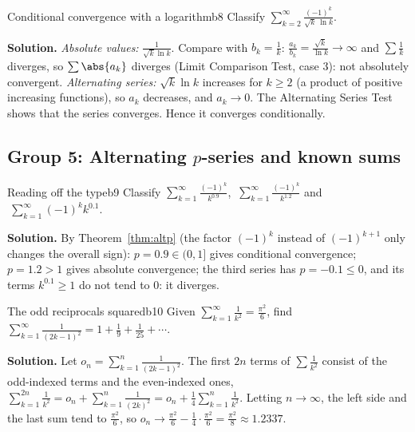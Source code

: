 \documentclass[11pt]{article}
\begin{document}
\begin{exmp}{Conditional convergence with a logarithm}{b8}
Classify $\displaystyle\sum_{k=2}^\infty\frac{(-1)^k}{\sqrt k\,\ln k}$.

\textbf{Solution.} \emph{Absolute values:} $\frac1{\sqrt k\ln k}$. Compare with $b_k=\frac1k$: $\frac{a_k}{b_k}=\frac{\sqrt k}{\ln k}\to\infty$ and $\sum\frac1k$ diverges, so $\sum\abs{a_k}$ diverges (Limit Comparison Test, case 3): not absolutely convergent. \emph{Alternating series:} $\sqrt k\ln k$ increases for $k\ge2$ (a product of positive increasing functions), so $a_k$ decreases, and $a_k\to0$. The Alternating Series Test shows that the series converges. Hence it converges conditionally.
\end{exmp}

\subsection*{Group 5: Alternating $p$-series and known sums}

\begin{exmp}{Reading off the type}{b9}
Classify $\displaystyle\sum_{k=1}^\infty\frac{(-1)^k}{k^{0.9}}$, $\ \displaystyle\sum_{k=1}^\infty\frac{(-1)^k}{k^{1.2}}$ and $\ \displaystyle\sum_{k=1}^\infty(-1)^kk^{0.1}$.

\textbf{Solution.} By Theorem~\ref{thm:altp} (the factor $(-1)^k$ instead of $(-1)^{k+1}$ only changes the overall sign): $p=0.9\in(0,1]$ gives conditional convergence; $p=1.2>1$ gives absolute convergence; the third series has $p=-0.1\le0$, and its terms $k^{0.1}\ge1$ do not tend to $0$: it diverges.
\end{exmp}

\begin{exmp}{The odd reciprocals squared}{b10}
Given $\sum_{k=1}^\infty\frac1{k^2}=\frac{\pi^2}6$, find $\displaystyle\sum_{k=1}^\infty\frac1{(2k-1)^2}=1+\frac19+\frac1{25}+\cdots$.

\textbf{Solution.} Let $o_n=\sum_{k=1}^n\frac1{(2k-1)^2}$. The first $2n$ terms of $\sum\frac1{k^2}$ consist of the odd-indexed terms and the even-indexed ones, $\sum_{k=1}^{2n}\frac1{k^2}=o_n+\sum_{k=1}^n\frac1{(2k)^2}=o_n+\frac14\sum_{k=1}^n\frac1{k^2}$. Letting $n\to\infty$, the left side and the last sum tend to $\frac{\pi^2}6$, so $o_n\to\frac{\pi^2}6-\frac14\cdot\frac{\pi^2}6=\frac{\pi^2}8\approx1.2337$.
\end{exmp}
\end{document}
